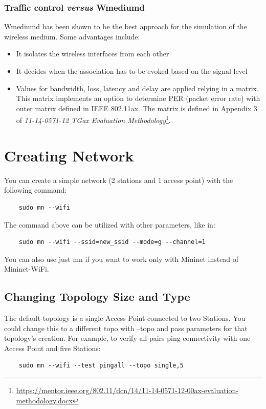 \subsubsection{Traffic control \textit{versus} Wmediumd}
Wmediumd has been shown to be the best approach for the simulation of the wireless medium. Some advantages include:

\begin{itemize}
  \item It isolates the wireless interfaces from each other
  \item It decides when the association has to be evoked based on the signal level
  \item Values for bandwidth, loss, latency and delay are applied relying in a matrix. This matrix implements an option to determine PER (packet error rate) with outer matrix
defined in IEEE 802.11ax. The matrix is defined in Appendix 3 of
\textit{11-14-0571-12 TGax Evaluation Methodology}\footnote{\url{https://mentor.ieee.org/802.11/dcn/14/11-14-0571-12-00ax-evaluation-methodology.docx}}.
\end{itemize}

\section{Creating Network}

You can create a simple network (2 stations and 1 access point) with the following command:
\begin{verbatim}
    sudo mn --wifi
\end{verbatim}

\noindent The command above can be utilized with other parameters, like in:
\begin{verbatim}
    sudo mn --wifi --ssid=new_ssid --mode=g --channel=1
\end{verbatim}

\noindent You can also use just mn if you want to work only with Mininet instead of Mininet-WiFi.

\subsection{Changing Topology Size and Type}
The default topology is a single Access Point connected to two Stations. You could change this to a different topo with --topo and pass parameters for that topology’s creation. For example, to verify all-pairs ping connectivity with one Access Point and five Stations:
\begin{verbatim}
    sudo mn --wifi --test pingall --topo single,5
\end{verbatim}

